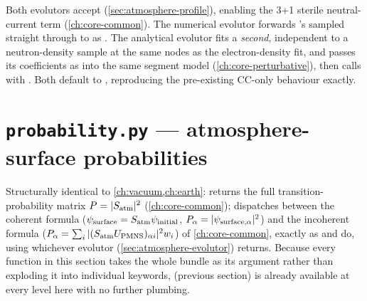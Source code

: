 \begin{implbox}
Both evolutors accept 
(\cref{sec:atmosphere-profile}), enabling the 3+1 sterile neutral-current
term (\cref{ch:core-common}). The numerical evolutor forwards
's sampled  straight through
to  as . The analytical
evolutor fits a \emph{second}, independent
 to a neutron-density sample at the
same nodes as the electron-density fit, and passes its coefficients as
 into the same segment model
(\cref{ch:core-perturbative}), then calls
 with
. Both default to , reproducing
the pre-existing CC-only behaviour exactly.
\end{implbox}

\section{\texttt{probability.py} --- atmosphere-surface probabilities}
\label{sec:atmosphere-probability}

{\sloppy{}}

\begin{implbox}
Structurally identical to \cref{ch:vacuum,ch:earth}:
returns the full transition-probability matrix $P=|S_{\rm atm}|^2$
(\cref{ch:core-common}); 
dispatches between the coherent formula
($\psi_{\rm surface}=S_{\rm atm}\psi_{\rm initial}$,
$P_\alpha=|\psi_{\rm surface,\alpha}|^2$) and the incoherent formula
($P_\alpha=\sum_i|(S_{\rm atm}U_{\rm PMNS})_{\alpha i}|^2w_i$) of
\cref{ch:core-common}, exactly as  and
 do,
using whichever evolutor 
(\cref{sec:atmosphere-evolutor}) returns. Because every function in this
section takes the whole  bundle as its
 argument rather than exploding it into individual
keywords,  (previous section) is already
available at every level here with no further plumbing.
\end{implbox}

